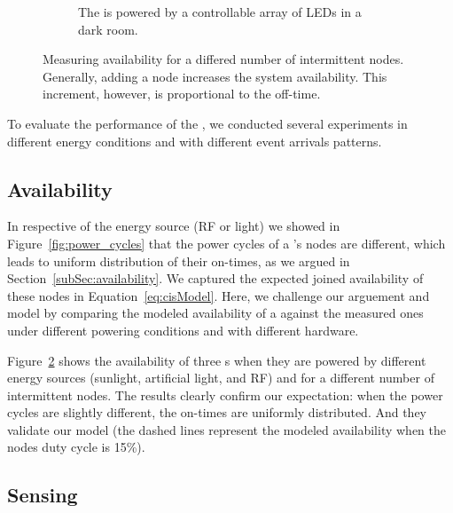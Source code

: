 \begin{figure}[h]
\begin{subfigure}{.66\columnwidth}
                \caption{The \sys is powered by a controllable array of LEDs in a dark room. \vspace{1em}}
            \label{fig:rfPwrCIS}
        \end{subfigure}
        \caption{Measuring \fullsys availability for a differed number of intermittent nodes. Generally, adding a node increases the system availability. This increment, however, is proportional to the \sys off-time.}
        \label{fig:pwrCIS}
\end{figure} 
To evaluate the performance of the \fullsys, we conducted several experiments in different energy conditions and with different event arrivals patterns. 
%
\subsection{Availability}
In respective of the energy source (RF or light) we showed in Figure~\ref{fig:power_cycles} that the power cycles of a \sys's nodes are different, which leads to uniform distribution of their on-times, as we argued in Section~\ref{subSec:availability}. We captured the expected joined availability of these nodes in Equation~\ref{eq:cisModel}.  Here, we challenge our arguement and model by comparing the modeled availability of a \sys against the measured ones under different powering conditions and with different hardware. 
 
Figure~\ref{fig:pwrCIS} shows the availability of three \sys{}s when they are powered by different energy sources (sunlight, artificial light, and RF) and for a different number of intermittent nodes.
The results clearly confirm our expectation: when the power cycles are slightly different, the on-times are uniformly distributed. And they validate our model (the dashed lines represent the modeled availability when the nodes duty cycle is 15\%).

\subsection{Sensing}
